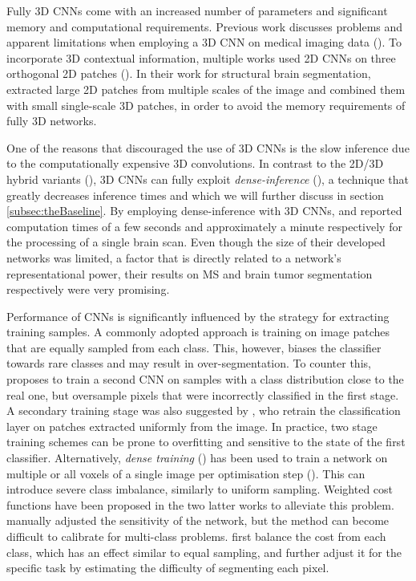 Fully 3D CNNs come with an increased number of parameters and significant memory and computational requirements. Previous work discusses problems and apparent limitations when employing a 3D CNN on medical imaging data (\cite{prasoon2013Knee, Li2014a, Roth2014}). To incorporate 3D contextual information, multiple works used 2D CNNs on three orthogonal 2D patches (\cite{prasoon2013Knee, Roth2014, lyksborg2015ensemble}). In their work for structural brain segmentation, \cite{Brebisson2015a} extracted large 2D patches from multiple scales of the image and combined them with small single-scale 3D patches, in order to avoid the memory requirements of fully 3D networks.

One of the reasons that discouraged the use of 3D CNNs is the slow inference due to the computationally expensive 3D convolutions. In contrast to the 2D/3D hybrid variants (\cite{Roth2014, Brebisson2015a}), 3D CNNs can fully exploit \textit{dense-inference} (\cite{LeCun1998,Sermanet2013}), a technique that greatly decreases inference times and which we will further discuss in section \ref{subsec:theBaseline}. By employing dense-inference with 3D CNNs, \cite{Brosch2015} and \cite{urban2014CnnBrats} reported computation times of a few seconds and approximately a minute respectively for the processing of a single brain scan. Even though the size of their developed networks was limited, a factor that is directly related to a network's representational power, their results on MS and brain tumor segmentation respectively were very promising.

Performance of CNNs is significantly influenced by the strategy for extracting training samples. A commonly adopted approach is training on image patches that are equally sampled from each class. This, however, biases the classifier towards rare classes and may result in over-segmentation. To counter this, \cite{Ciresan2013} proposes to train a second CNN on samples with a class distribution close to the real one, but oversample pixels that were incorrectly classified in the first stage. A secondary training stage was also suggested by \cite{Havei2015Journal}, who retrain the classification layer on patches extracted uniformly from the image. In practice, two stage training schemes can be prone to overfitting and sensitive to the state of the first classifier. Alternatively, \textit{dense training} (\cite{Long2014}) has been used to train a network on multiple or all voxels of a single image per optimisation step (\cite{urban2014CnnBrats, Brosch2015, Ronneberger2015}). This can introduce severe class imbalance, similarly to uniform sampling. Weighted cost functions have been proposed in the two latter works to alleviate this problem. \cite{Brosch2015} manually adjusted the sensitivity of the network, but the method can become difficult to calibrate for multi-class problems. \cite{Ronneberger2015} first balance the cost from each class, which has an effect similar to equal sampling, and further adjust it for the specific task by estimating the difficulty of segmenting each pixel.

